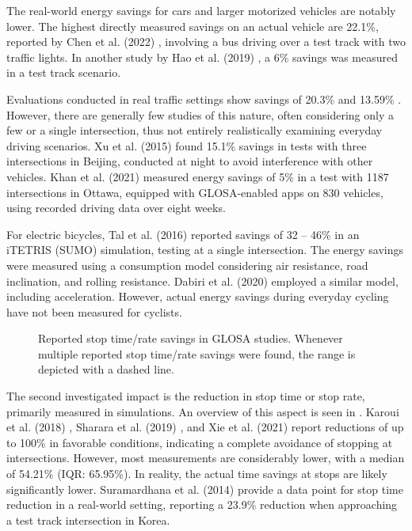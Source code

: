 The real-world energy savings for cars and larger motorized vehicles are notably lower. The highest directly measured savings on an actual vehicle are 22.1\%, reported by Chen et al. (2022) \cite{chen_developing_2022}, involving a bus driving over a test track with two traffic lights. In another study by Hao et al. (2019) \cite{hao_eco-approach_2019}, a 6\% savings was measured in a test track scenario.

Evaluations conducted in real traffic settings show savings of 20.3\% \cite{koukoumidis_signalguru_2011} and 13.59\% \cite{xia_field_2012}. However, there are generally few studies of this nature, often considering only a few or a single intersection, thus not entirely realistically examining everyday driving scenarios. Xu et al. (2015) \cite{xu_bb_2015} found 15.1\% savings in tests with three intersections in Beijing, conducted at night to avoid interference with other vehicles. Khan et al. (2021) \cite{khan_eco-drive_2021} measured energy savings of 5\% in a test with 1187 intersections in Ottawa, equipped with GLOSA-enabled apps on 830 vehicles, using recorded driving data over eight weeks.

For electric bicycles, Tal et al. (2016) \cite{tal_vehicular-communications-based_2016} reported savings of 32 -- 46\% in an iTETRIS (SUMO) simulation, testing at a single intersection. The energy savings were measured using a consumption model considering air resistance, road inclination, and rolling resistance. Dabiri et al. (2020) \cite{dabiri_optimized_2020} employed a similar model, including acceleration. However, actual energy savings during everyday cycling have not been measured for cyclists.

\begin{figure}
\centering
\resizebox{\linewidth}{!}{%

}
\caption{Reported stop time/rate savings in GLOSA studies. Whenever multiple reported stop time/rate savings were found, the range is depicted with a dashed line.}
\label{fig:related-work-stops}
\end{figure}

The second investigated impact is the reduction in stop time or stop rate, primarily measured in simulations. An overview of this aspect is seen in . Karoui et al. (2018) \cite{karoui_efficiency_2018}, Sharara et al. (2019) \cite{sharara_impact_2019}, and Xie et al. (2021) \cite{xie_dynamic_2021} report reductions of up to 100\% in favorable conditions, indicating a complete avoidance of stopping at intersections. However, most measurements are considerably lower, with a median of 54.21\% (IQR: 65.95\%). In reality, the actual time savings at stops are likely significantly lower. Suramardhana et al. (2014) \cite{suramardhana_driver-centric_2014} provide a data point for stop time reduction in a real-world setting, reporting a 23.9\% reduction when approaching a test track intersection in Korea.


